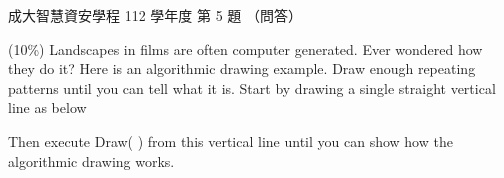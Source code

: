 \begin{pastexam}[label={px:ncku-112-isec-ds-05}]{成大智慧資安學程 112 學年度 第 5 題}
（問答）

(10\%) Landscapes in films are often computer generated. Ever wondered how they do it? Here is an
algorithmic drawing example. Draw enough repeating patterns until you can tell what it is. Start by
drawing a single straight vertical line as below

\begin{center}
\end{center}

Then execute Draw( ) from this vertical line until you can show how the algorithmic drawing works.

\begin{center}
\end{center}
\end{pastexam}

